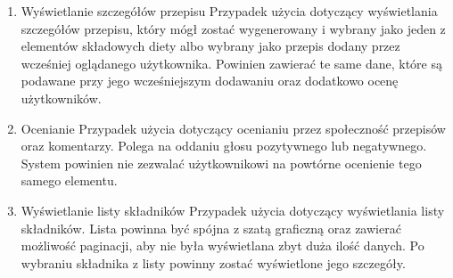 \begin{enumerate}
    \item Wyświetlanie szczegółów przepisu\newline
    Przypadek użycia dotyczący wyświetlania szczegółów przepisu, który mógł zostać wygenerowany i wybrany jako jeden z elementów składowych diety albo wybrany jako przepis dodany przez wcześniej oglądanego użytkownika. Powinien zawierać te same dane, które są podawane przy jego wcześniejszym dodawaniu oraz dodatkowo ocenę użytkowników.

    \item Ocenianie\newline
    Przypadek użycia dotyczący ocenianiu przez społeczność przepisów oraz komentarzy. Polega na oddaniu głosu pozytywnego lub negatywnego. System powinien nie zezwalać użytkownikowi na powtórne ocenienie tego samego elementu.
    
    \item Wyświetlanie listy składników\newline
    Przypadek użycia dotyczący wyświetlania listy składników. Lista powinna być spójna z szatą graficzną oraz zawierać możliwość paginacji, aby nie była wyświetlana zbyt duża ilość danych. Po wybraniu składnika z listy powinny zostać wyświetlone jego szczegóły.
\end{enumerate}
